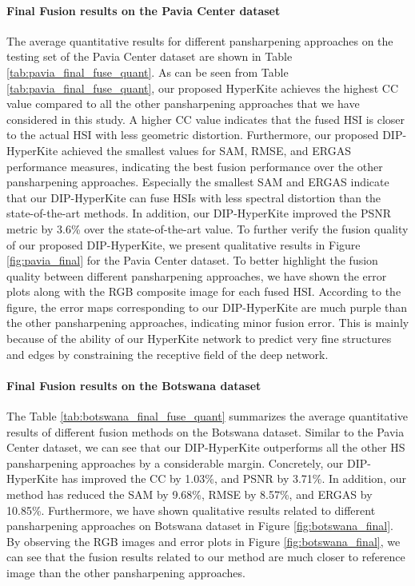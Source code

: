 \documentclass[journal]{IEEEtran}
\begin{document}
    \paragraph{Final Fusion results on the Pavia Center dataset}
    The average quantitative results for different pansharpening approaches on the testing set of the Pavia Center dataset are shown in Table \ref{tab:pavia_final_fuse_quant}. As can be seen from Table  \ref{tab:pavia_final_fuse_quant}, our proposed HyperKite achieves the highest CC value compared to all the other pansharpening approaches that we have considered in this study. A higher CC value indicates that the fused HSI is closer to the actual HSI with less geometric distortion. Furthermore, our proposed DIP-HyperKite achieved the smallest values for SAM, RMSE, and ERGAS performance measures, indicating the best fusion performance over the other pansharpening approaches. Especially the smallest SAM and ERGAS indicate that our DIP-HyperKite can fuse HSIs with less spectral distortion than the state-of-the-art methods. In addition, our DIP-HyperKite improved the PSNR metric by 3.6\% over the state-of-the-art value. To further verify the fusion quality of our proposed DIP-HyperKite, we present qualitative results in Figure \ref{fig:pavia_final} for the Pavia Center dataset. To better highlight the fusion quality between different pansharpening approaches, we have shown the error plots along with the RGB composite image for each fused HSI. According to the figure, the error maps corresponding to our DIP-HyperKite are much purple than the other pansharpening approaches, indicating minor fusion error. This is mainly because of the ability of our HyperKite network to predict very fine structures and edges by constraining the receptive field of the deep network.
    
    \paragraph{Final Fusion results on the Botswana dataset} 
    The Table \ref{tab:botswana_final_fuse_quant} summarizes the average quantitative results of different fusion methods on the Botswana dataset. Similar to the Pavia Center dataset, we can see that our DIP-HyperKite outperforms all the other HS pansharpening approaches by a considerable margin. Concretely, our DIP-HyperKite has improved the CC by 1.03\%, and PSNR by 3.71\%. In addition, our method has reduced the SAM by 9.68\%, RMSE by 8.57\%, and ERGAS by 10.85\%. Furthermore, we have shown qualitative results related to different pansharpening approaches on Botswana dataset in Figure \ref{fig:botswana_final}. By observing the RGB images and error plots in Figure \ref{fig:botswana_final}, we can see that the fusion results related to our method are much closer to reference image than the other pansharpening approaches.
    
\end{document}

